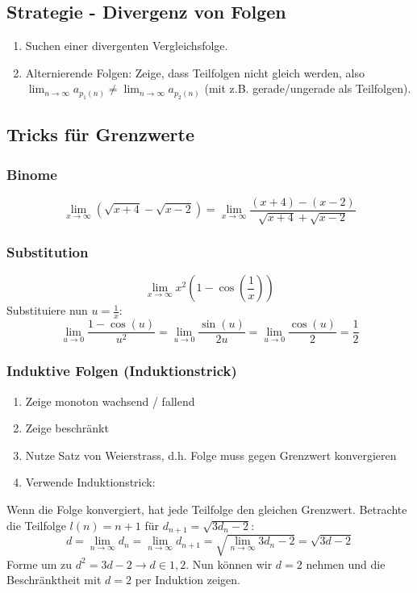 \documentclass[a4paper,10pt]{article}
\def\limn{\lim_{n\to \infty}}
\begin{document}
\subsection{Strategie - Divergenz von Folgen}
\begin{enumerate}
 \item Suchen einer divergenten Vergleichsfolge.
 \item Alternierende Folgen: Zeige, dass Teilfolgen nicht gleich werden, also $\limn a_{p_1(n)} \ne \limn a_{p_2(n)}$ (mit z.B. gerade/ungerade als Teilfolgen).
\end{enumerate}

\subsection{Tricks für Grenzwerte}
\subsubsection{Binome}
$$\lim_{x\to\infty} (\sqrt{x + 4} - \sqrt{x - 2}) = \lim_{x\to\infty} \frac{(x+4)-(x-2)}{\sqrt{x+4}+\sqrt{x-2}}$$

\subsubsection{Substitution}
$$\lim_{x\to\infty} x^2 (1-\cos(\frac{1}{x}))$$
Substituiere nun $u = \frac{1}{x}$:
$$\lim_{u \to 0} \frac{1 - \cos(u)}{u^2} = \lim_{u \to 0} \frac{\sin(u)}{2u} = \lim_{u\to 0} \frac{\cos(u)}{2} = \frac{1}{2}$$

\subsubsection{Induktive Folgen (Induktionstrick)}
\begin{enumerate}
  \item Zeige monoton wachsend / fallend
  \item Zeige beschränkt
  \item Nutze Satz von Weierstrass, d.h. Folge muss gegen Grenzwert konvergieren
  \item Verwende Induktionstrick:
\end{enumerate}
Wenn die Folge konvergiert, hat jede Teilfolge den gleichen Grenzwert. Betrachte die Teilfolge $l(n) = n + 1$ für $d_{n+1} = \sqrt{3d_n - 2}$:
$$d = \lim_{n\to\infty} d_n = \lim_{n\to\infty} d_{n+1} = \sqrt{\lim_{n \to \infty} 3d_n -2} = \sqrt{3d -2}$$
Forme um zu $ d^2 = 3d -2 \to d \in {1,2}$. Nun können wir $d = 2$ nehmen und die Beschränktheit mit $d=2$ per Induktion zeigen.
\end{document}
